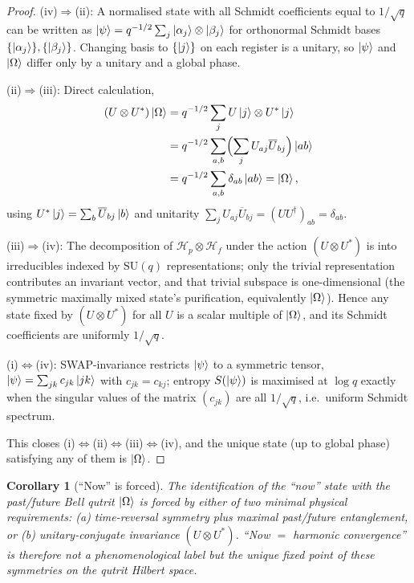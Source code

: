 ﻿\documentclass[12pt]{article}
\newtheorem{corollary}[theorem]{Corollary}
\begin{document}
\begin{proof}
(iv)$\Rightarrow$(ii):  A normalised state with all Schmidt coefficients equal
to $1/\sqrt q$ can be written as $\ket{\psi} = q^{-1/2}\sum_j \ket{\alpha_j}
\otimes\ket{\beta_j}$ for orthonormal Schmidt bases $\{\ket{\alpha_j}\},
\{\ket{\beta_j}\}$.  Changing basis to $\{\ket j\}$ on each register is a
unitary, so $\ket{\psi}$ and $\ket{\Omega}$ differ only by a unitary and a
global phase.

(ii)$\Rightarrow$(iii):  Direct calculation,
\begin{equation*}
\begin{aligned}
  (U\otimes U^*)\ket{\Omega}
  &= q^{-1/2}\sum_j U\ket{j}\otimes U^*\ket{j}\\
  &= q^{-1/2}\sum_{a,b}\Bigl(\sum_j U_{aj}\overline{U}_{bj}\Bigr)\ket{ab}\\
  &= q^{-1/2}\sum_{a,b}\delta_{ab}\ket{ab}
   = \ket{\Omega},
\end{aligned}
\end{equation*}
using $U^*\ket{j} = \sum_b\overline U_{bj}\ket{b}$ and unitarity
$\sum_j U_{aj}\overline U_{bj} = (UU^\dagger)_{ab} = \delta_{ab}$.

(iii)$\Rightarrow$(iv):  The decomposition of $\mathcal H_p\otimes\mathcal H_f$
under the action $(U\otimes U^*)$ is into irreducibles indexed by $\mathrm{SU}(q)$
representations; only the trivial representation contributes an invariant
vector, and that trivial subspace is one-dimensional (the symmetric maximally
mixed state's purification, equivalently $\ket{\Omega}$).  Hence any state fixed
by $(U\otimes U^*)$ for all $U$ is a scalar multiple of $\ket{\Omega}$, and its
Schmidt coefficients are uniformly $1/\sqrt q$.

(i)$\Leftrightarrow$(iv):  SWAP-invariance restricts $\ket{\psi}$ to a symmetric
tensor, $\ket{\psi} = \sum_{jk}c_{jk}\ket{jk}$ with $c_{jk}=c_{kj}$; entropy
$S(\ket{\psi})$ is maximised at $\log q$ exactly when the singular values of the
matrix $(c_{jk})$ are all $1/\sqrt q$, i.e.\ uniform Schmidt spectrum.

This closes (i)$\Leftrightarrow$(ii)$\Leftrightarrow$(iii)$\Leftrightarrow$(iv),
and the unique state (up to global phase) satisfying any of them is
$\ket{\Omega}$.
\end{proof}

\begin{corollary}[``Now'' is forced]\label{cor:now_forced}
The identification of the ``now'' state with the past/future Bell qutrit
$\ket{\Omega}$ is forced by either of two minimal physical requirements:
(a) time-reversal symmetry plus maximal past/future entanglement, or
(b) unitary-conjugate invariance $(U\otimes U^*)$.  ``Now $=$ harmonic
convergence'' is therefore not a phenomenological label but the unique fixed
point of these symmetries on the qutrit Hilbert space.
\end{corollary}
\end{document}
